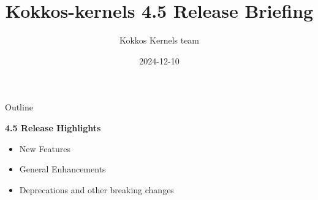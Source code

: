 
\usepackage{tikz}
\graphicspath{{kk_4_5/figures/}}

\def\sandid{SAND2024-16526PE}

\title{Kokkos-kernels 4.5 Release Briefing}

\author{Kokkos Kernels team}

\date{2024-12-10}



\shorttrue
\mediumfalse
\fullfalse



\begin{frame}
  \titlepage
\end{frame}


\begin{frame}[fragile]{Outline}

  \textbf{4.5 Release Highlights}

  \begin{itemize}
    \item{New Features}
    \item{General Enhancements}
    \item{Deprecations and other breaking changes}
  \end{itemize}

\end{frame}

